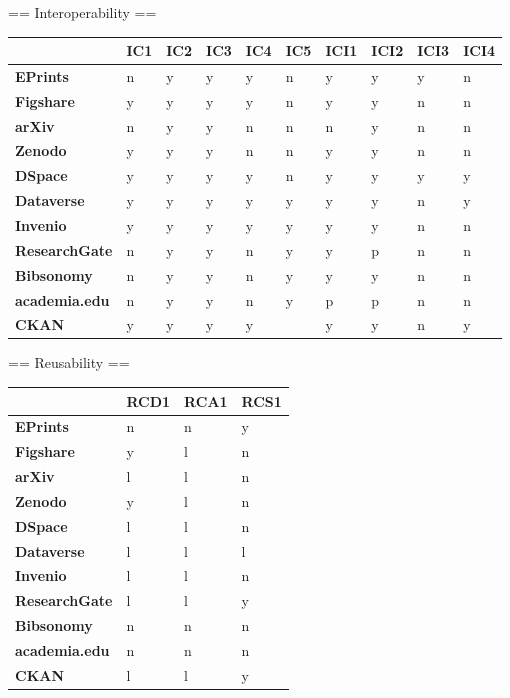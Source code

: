 == Interoperability ==

\begin{tabular}{|m{2.1cm}|m{0.8cm}|m{0.8cm}|m{0.8cm}|m{0.8cm}|m{0.8cm}|m{0.8cm}|m{0.8cm}|m{0.8cm}|m{0.8cm}|} \hline 
 & \textbf{IC1}  & \textbf{IC2}  & \textbf{IC3}  & \textbf{IC4}  & \textbf{IC5}  & \textbf{ICI1}  & \textbf{ICI2}  & \textbf{ICI3}  & \textbf{ICI4}  \\ \hline \textbf{EPrints}  &n &y &y &y &n &y &y &y &n \\ \hline 
\textbf{Figshare}  &y &y &y &y &n &y &y &n &n \\ \hline 
\textbf{arXiv}  &n &y &y &n &n &n &y &n &n \\ \hline 
\textbf{Zenodo}  &y &y &y &n &n &y &y &n &n \\ \hline 
\textbf{DSpace}  &y &y &y &y &n &y &y &y &y \\ \hline 
\textbf{Dataverse}  &y &y &y &y &y &y &y &n &y \\ \hline 
\textbf{Invenio}  &y &y &y &y &y &y &y &n &n \\ \hline 
\textbf{ResearchGate}  &n &y &y &n &y &y &p &n &n \\ \hline 
\textbf{Bibsonomy}  &n &y &y &n &y &y &y &n &n \\ \hline 
\textbf{academia.edu}  &n &y &y &n &y &p &p &n &n \\ \hline 
\textbf{CKAN}  &y &y &y &y & &y &y &n &y \\ \hline 
 \end{tabular}


== Reusability ==

\begin{tabular}{|m{2.1cm}|m{0.8cm}|m{0.8cm}|m{0.8cm}|} \hline 
 & \textbf{RCD1}  & \textbf{RCA1}  & \textbf{RCS1}  \\ \hline \textbf{EPrints}  &n &n &y \\ \hline 
\textbf{Figshare}  &y &l &n \\ \hline 
\textbf{arXiv}  &l &l &n \\ \hline 
\textbf{Zenodo}  &y &l &n \\ \hline 
\textbf{DSpace}  &l &l &n \\ \hline 
\textbf{Dataverse}  &l &l &l \\ \hline 
\textbf{Invenio}  &l &l &n \\ \hline 
\textbf{ResearchGate}  &l &l &y \\ \hline 
\textbf{Bibsonomy}  &n &n &n \\ \hline 
\textbf{academia.edu}  &n &n &n \\ \hline 
\textbf{CKAN}  &l &l &y \\ \hline 
 \end{tabular}


